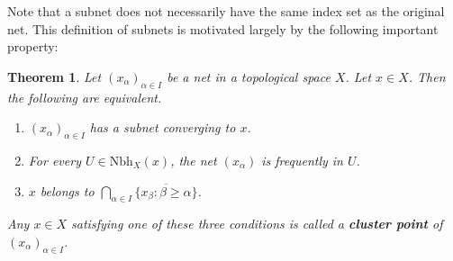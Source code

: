 \documentclass[12pt,b5paper,notitlepage]{article}
\theoremstyle{definition}
\theoremstyle{plain}
\newtheorem{thm}[df]{Theorem}
\newcommand{\ovl}{\overline}
\newcommand{\dps}{\displaystyle}
\newcommand{\Nbh}{\mathrm{Nbh}}
\numberwithin{equation}{section}
\begin{document}
Note that a subnet does not necessarily have the same index set as the original net. This definition of subnets is motivated largely by the following important property:

\begin{thm}\label{lb213}
Let $(x_\alpha)_{\alpha\in I}$ be a net in a topological space $X$. Let $x\in X$. Then the following are equivalent.
\begin{enumerate}[label=(\arabic*)]
\item $(x_\alpha)_{\alpha\in I}$ has a subnet converging to $x$.
\item For every $U\in\Nbh_X(x)$, the net $(x_\alpha)$ is frequently in $U$.
\item $x$ belongs to $\dps\bigcap_{\alpha\in I}\ovl{\{x_\beta:\beta\geq\alpha\}}$.
\end{enumerate}
Any $x\in X$ satisfying one of these three conditions is called a \textbf{cluster point}  of $(x_\alpha)_{\alpha\in I}$.
\end{thm}
\end{document}

